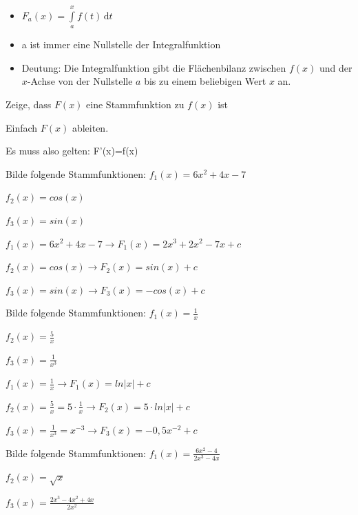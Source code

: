 \documentclass[paper=a6,landscape,ngerman,twoside=true,fontsize=12pt]{scrartcl}
\begin{document}
\begin{antwort}
	\begin{itemize}
		\item $F_a(x)=\displaystyle\int\limits_{a}^{x} \! f(t) \, \mathrm{d}t$
		\item a ist immer eine Nullstelle der Integralfunktion
		\item Deutung: Die Integralfunktion gibt die Flächenbilanz zwischen $f(x)$ und der $x$-Achse von der Nullstelle $a$ bis zu einem beliebigen Wert $x$ an.		
	\end{itemize}
\end{antwort}
\begin{frage}
	Zeige, dass $F(x)$ eine Stammfunktion zu $f(x)$ ist
\end{frage}
\begin{antwort}
	Einfach $F(x)$ ableiten. 
	
	Es muss also gelten: F'(x)=f(x)
\end{antwort}
\begin{frage}
	Bilde folgende Stammfunktionen: 
	\flushleft 
	$f_1(x)=6x^2+4x-7$
	
	\bigskip
   	$f_2(x)=cos(x)$
   	
   	\bigskip
	$f_3(x)=sin(x)$	
\end{frage}
\begin{antwort}
	\flushleft
	$f_1(x)=6x^2+4x-7 \longrightarrow F_1(x)=2x^3+2x^2-7x+c$ 

	\bigskip
	$f_2(x)=cos(x) \longrightarrow F_2(x)=sin(x)+c$
	
	\bigskip	
    $f_3(x)=sin(x) \longrightarrow F_3(x)=-cos(x)+c$
	
\end{antwort}
\begin{frage}
	Bilde folgende Stammfunktionen: 
	\flushleft 
	$f_1(x)=\frac{1}{x}$
	
	\bigskip
	$f_2(x)=\frac{5}{x}$
	
	\bigskip
	$f_3(x)=\frac{1}{x^3}$	
\end{frage}
\begin{antwort}
	\flushleft
	$f_1(x)=\frac{1}{x} \longrightarrow F_1(x)=ln|x|+c$ 
	
	\bigskip
	$f_2(x)=\frac{5}{x}=5\cdot\frac{1}{x}  \longrightarrow F_2(x)=5\cdot ln|x|+c$ 
	
	\bigskip	
	$f_3(x)=\frac{1}{x^3}=x^{-3} \longrightarrow F_3(x)=-0,5x^{-2}+c$
	
\end{antwort}
\begin{frage}
	Bilde folgende Stammfunktionen: 
	\flushleft 
	$f_1(x)=\frac{6x^2-4}{2x^3-4x}$
	
	\bigskip
	$f_2(x)=\sqrt{x}$
	
	\bigskip
	$f_3(x)=\frac{2x^3-4x^2+4x}{2x^2}$	
\end{frage}
\end{document}
